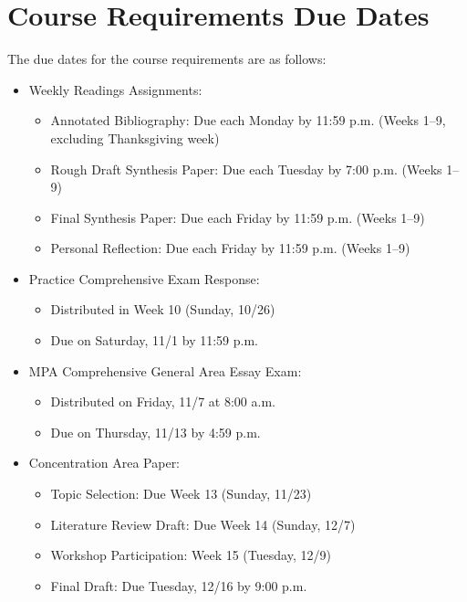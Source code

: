 \documentclass[12pt, letterpaper]{article}
\begin{document}
\section{Course Requirements Due Dates}

The due dates for the course requirements are as follows:
    \begin{itemize}
        \item Weekly Readings Assignments:
        \begin{itemize}
            \item Annotated Bibliography: Due each Monday by 11:59 p.m. (Weeks 1–9, excluding Thanksgiving week)
            \item Rough Draft Synthesis Paper: Due each Tuesday by 7:00 p.m. (Weeks 1–9)
            \item Final Synthesis Paper: Due each Friday by 11:59 p.m. (Weeks 1–9)
            \item Personal Reflection: Due each Friday by 11:59 p.m. (Weeks 1–9)
        \end{itemize}
        \item Practice Comprehensive Exam Response:
        \begin{itemize}
            \item Distributed in Week 10 (Sunday, 10/26)
            \item Due on Saturday, 11/1 by 11:59 p.m.
        \end{itemize}
        \item MPA Comprehensive General Area Essay Exam:
        \begin{itemize}
            \item Distributed on Friday, 11/7 at 8:00 a.m.
            \item Due on Thursday, 11/13 by 4:59 p.m.
        \end{itemize}
        \item Concentration Area Paper:
        \begin{itemize}
            \item Topic Selection: Due Week 13 (Sunday, 11/23)
            \item Literature Review Draft: Due Week 14 (Sunday, 12/7)
            \item Workshop Participation: Week 15 (Tuesday, 12/9)
            \item Final Draft: Due Tuesday, 12/16 by 9:00 p.m.
        \end{itemize}
    \end{itemize}
\end{document}
